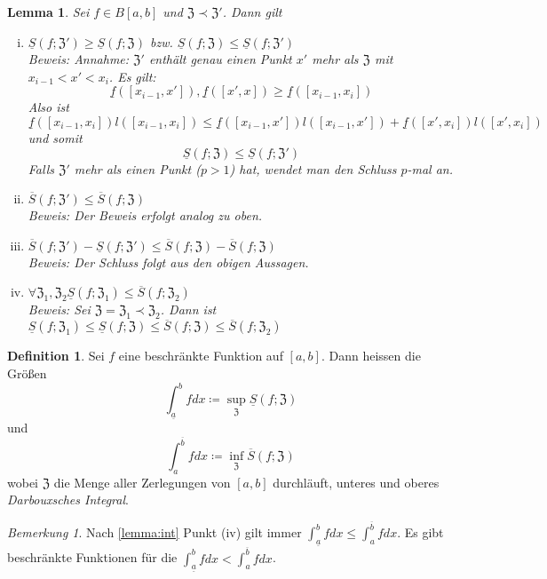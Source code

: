 \documentclass[ngerman,titlepage,twoside, parskip=half*]{scrreprt}
\newcommand*{\ZZ}{\mathfrak{Z}}
\theoremstyle{plain}
\newtheorem{lemma}{Lemma}
\theoremstyle{definition}
\newtheorem{definition}{Definition}
\theoremstyle{remark}
\newtheorem*{remark}{Bemerkung}
\begin{document}
\begin{lemma}
  \label{lemma:int}
  Sei $f\in B[a,b]$ und $\ZZ\prec \ZZ'$. Dann gilt
  \begin{enumerate}[(i)]
    \item $\underline{S}(f;\ZZ')\geq \underline{S}(f;\ZZ)$
      bzw. $\underline{S}(f;\ZZ) \leq \underline{S}(f; \ZZ')$\\
      \textit{Beweis}: Annahme: $\ZZ'$ enthält genau einen Punkt $x'$ mehr
      als $\ZZ$ mit $x_{i-1}<x'<x_i$. Es gilt:
      \[\underline{f}([x_{i-1},x']),\underline{f}([x',x])\geq \underline{f}
      ([x_{i-1},x_i])\]
      Also ist $\underline{f}([x_{i-1},x_i])l([x_{i-1},x_i])\leq 
      \underline{f}([x_{i-1},x'])l([x_{i-1},x'])+\underline{f}([x',x_i])
      l([x',x_i])$ und somit
      \[\underline{S}(f;\ZZ)\leq \underline{S}(f;\ZZ')\]
      Falls $\ZZ'$ mehr als einen Punkt ($p>1$) hat, wendet man den Schluss
      $p$-mal an.
    \item $\overline{S}(f;\ZZ')\leq \overline{S}(f;\ZZ)$\\
      \textit{Beweis}: Der Beweis erfolgt analog zu oben.
    \item $\overline{S}(f;\ZZ')-\underline{S}(f;\ZZ')\leq \overline{S}(f;\ZZ)
      -\overline{S}(f;\ZZ)$\\
      \textit{Beweis}: Der Schluss folgt aus den obigen Aussagen.
    \item $\forall \ZZ_1,\ZZ_2 \underline{S}(f;\ZZ_1)\leq \overline{S}
      (f;\ZZ_2)$\\
      \textit{Beweis}: Sei $\ZZ=\ZZ_1\prec \ZZ_2$. Dann ist $\underline{S}
      (f;\ZZ_1)\leq \underline{S}(f;\ZZ)\leq \overline{S}(f;\ZZ)\leq
      \overline{S}(f;\ZZ_2)$
  \end{enumerate}
\end{lemma}

\begin{definition}
  Sei $f$ eine beschränkte Funktion auf $[a,b]$. Dann heissen die Größen
  \[\int_{\underline{a}}^b fdx \coloneqq \sup_\ZZ \underline{S}(f;\ZZ)\]
  und
  \[\int_a^{\overline{b}} fdx \coloneqq \inf_\ZZ \overline{S}(f;\ZZ)\]
  wobei $\ZZ$ die Menge aller Zerlegungen von $[a,b]$ durchläuft, unteres
  und oberes \emph{Darbouxsches Integral}.
\end{definition}

\begin{remark}
  Nach \autoref{lemma:int} Punkt (iv) gilt immer
  $\int_{\underline{a}}^b fdx\leq \int_a^{\overline{b}}fdx$. Es gibt
  beschränkte Funktionen für die $\int_{\underline{a}}^b fdx<
  \int_a^{\overline{b}}fdx$.
\end{remark}
\end{document}
